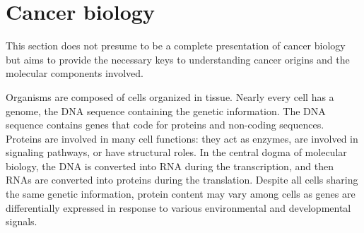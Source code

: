 \documentclass[../main.tex]{subfiles}
\begin{document}
\section{Cancer biology}
 This section does not presume to be a complete presentation of cancer biology but aims to provide the necessary keys to understanding cancer origins and the molecular components involved.

 Organisms are composed of cells organized in tissue.
 Nearly every cell has a genome, the DNA sequence containing the genetic information.
 The DNA sequence contains genes that code for proteins and non-coding sequences.
 Proteins are involved in many cell functions: they act as enzymes, are involved in signaling pathways, or have structural roles.
 In the central dogma of molecular biology, the DNA is converted into RNA  during the transcription, and then RNAs are converted into proteins during the translation.
 Despite all cells sharing the same genetic information, protein content may vary among cells as genes are differentially expressed in response to various environmental and developmental signals.
\end{document}
